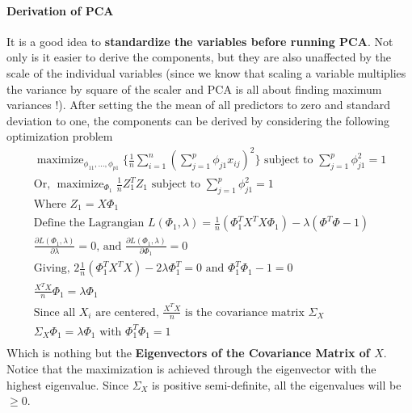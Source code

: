 \documentclass[11pt, a4paper]{article}
\DeclareMathOperator*{\maximize}{maximize}
\begin{document}
    \paragraph{Derivation of PCA}
    It is a good idea to \textbf{standardize the variables before running PCA}. Not only is it easier to derive the components, but they are also unaffected by the scale of the individual variables (since we know that scaling a variable multiplies the variance by square of the scaler and PCA is all about finding maximum variances !). \newline \newline
    After setting the the mean of all predictors to zero and standard deviation to one, the components can be derived by considering the following optimization problem
    \begin{gather*}
        \maximize_{\phi_{11},\ldots,\phi_{p1}} \big\{ \frac{1}{n} \sum_{i=1}^{n} (\sum_{j=1}^{p}\phi_{j1}x_{ij})^{2} \big\} \text{ subject to } \sum_{j=1}^{p} \phi_{j1}^{2} = 1\\
        \text{Or, } \maximize_{\Phi_{1}} \frac{1}{n} Z_{1}^{T}Z_{1} \text{ subject to } \sum_{j=1}^{p} \phi_{j1}^{2} = 1\\
        \text{Where } Z_{1} = X\Phi_{1}\\
        \text{Define the Lagrangian } L(\Phi_{1}, \lambda) = \frac{1}{n} (\Phi_{1}^{T}X^{T}X\Phi_{1}) - \lambda (\Phi^{T}\Phi - 1)\\
        \frac{\partial L(\Phi_{1}, \lambda)}{\partial \lambda} = 0 \text{, and } \frac{\partial L(\Phi_{1}, \lambda)}{\partial \Phi_{1}} = 0 \\
        \text{Giving, } 2\frac{1}{n}(\Phi_{1}^{T}X^{T}X) - 2\lambda \Phi_{1}^{T} = 0 \text{ and } \Phi_{1}^{T}\Phi_{1} - 1 = 0\\
        \frac{X^{T}X}{n}\Phi_{1} = \lambda \Phi_{1}\\
        \text{Since all } X_{i} \text{ are centered, } \frac{X^{T}X}{n} \text{ is the covariance matrix } \Sigma_{X}\\
        \Sigma_{X} \Phi_{1} = \lambda \Phi_{1} \text{ with } \Phi_{1}^{T}\Phi_{1} = 1\\
    \end{gather*}
    Which is nothing but the \textbf{Eigenvectors of the Covariance Matrix of $X$}. Notice that the maximization is achieved through the eigenvector with the highest eigenvalue. Since $\Sigma_{X}$ is positive semi-definite, all the eigenvalues will be $\geq 0$. \newline
\end{document}
